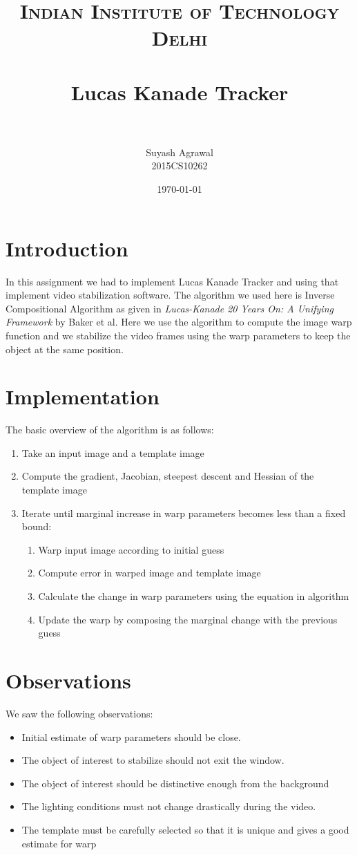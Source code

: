 \documentclass[paper=a4, fontsize=11pt]{scrartcl} %
\title{	
\normalfont \normalsize 
\textsc{Indian Institute of Technology Delhi} \\ [25pt] %
\horrule{0.5pt} \\[0.4cm] %
\huge Lucas Kanade Tracker \\ %
\horrule{2pt} \\[0.5cm] %
}
\author{Suyash Agrawal \\ 2015CS10262} %
\date{\normalsize\today} %
\begin{document}
\maketitle %

\section{Introduction}
In this assignment we had to implement Lucas Kanade Tracker and using that implement video stabilization
software. The algorithm we used here is Inverse Compositional Algorithm as given in
\textit{Lucas-Kanade 20 Years On: A Unifying Framework} by Baker et al. Here we use the algorithm to compute
the image warp function and we stabilize the video frames using the warp parameters to keep the object at the
same position.

\section{Implementation}
The basic overview of the algorithm is as follows:
\begin{enumerate}
  \item Take an input image and a template image
  \item Compute the gradient, Jacobian, steepest descent and Hessian of the template image
  \item Iterate until marginal increase in warp parameters becomes less than a fixed bound:
  \begin{enumerate}
    \item Warp input image according to initial guess
    \item Compute error in warped image and template image
    \item Calculate the change in warp parameters using the equation in algorithm
    \item Update the warp by composing the marginal change with the previous guess
  \end{enumerate}
\end{enumerate}

\section{Observations}
  We saw the following observations:
  \begin{itemize}
    \item Initial estimate of warp parameters should be close.
    \item The object of interest to stabilize should not exit the window.
    \item The object of interest should be distinctive enough from the background
    \item The lighting conditions must not change drastically during the video.
    \item The template must be carefully selected so that it is unique and gives a good estimate for warp
  \end{itemize}
  
\end{document}

